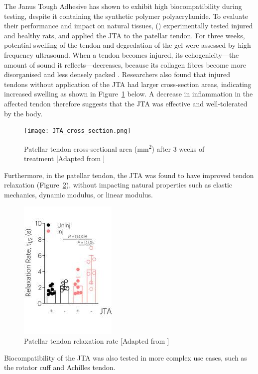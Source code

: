 The Janus Tough Adhesive has shown to exhibit high biocompatibility during testing, despite it containing the synthetic polymer polyacrylamide. To evaluate their performance and impact on natural tissues, \citeauthor{freedmanEnhancedTendonHealing2022} (\citeyear{freedmanEnhancedTendonHealing2022}) experimentally tested  injured and healthy rats, and applied the JTA to the patellar tendon.
For three weeks, potential swelling of the tendon and degredation of the gel were assessed by high frequency ultrasound. When a tendon becomes injured, its echogenicity---the amount of sound it reflects---decreases, because its collagen fibres become more disorganised and less densely packed \autocite{hodgsonTendonLigamentImaging2012}.
Researchers also found that injured tendons without application of the JTA had larger cross-section areas, indicating increased swelling as shown in Figure~\ref{fig:JTA_Patellar_cross_section} below. A decrease in inflammation in the affected tendon therefore suggests that the JTA was effective and well-tolerated by the body.
\begin{figure}[h]
    \centering
    \texttt{[image: JTA\_cross\_section.png]}
    \caption{Patellar tendon cross-sectional area (mm\textsuperscript{2}) after 3 weeks of treatment [Adapted from \cite{freedmanEnhancedTendonHealing2022}]}
    \label{fig:JTA_Patellar_cross_section}
\end{figure}

Furthermore, in the patellar tendon, the JTA was found to have improved tendon relaxation (Figure~\ref{fig:JTA_Patellar_relaxation}), without impacting natural properties such as elastic mechanics, dynamic modulus, or linear modulus.
\begin{figure}[h]
    \centering
    \includegraphics[width=0.6\linewidth]{Figures/JTA_relaxation_patellar.jpeg}
    \caption{Patellar tendon relaxation rate [Adapted from \cite{freedmanEnhancedTendonHealing2022}]}
    \label{fig:JTA_Patellar_relaxation}
\end{figure}

Biocompatibility of the JTA was also tested in more complex use cases, such as the rotator cuff and Achilles tendon. 